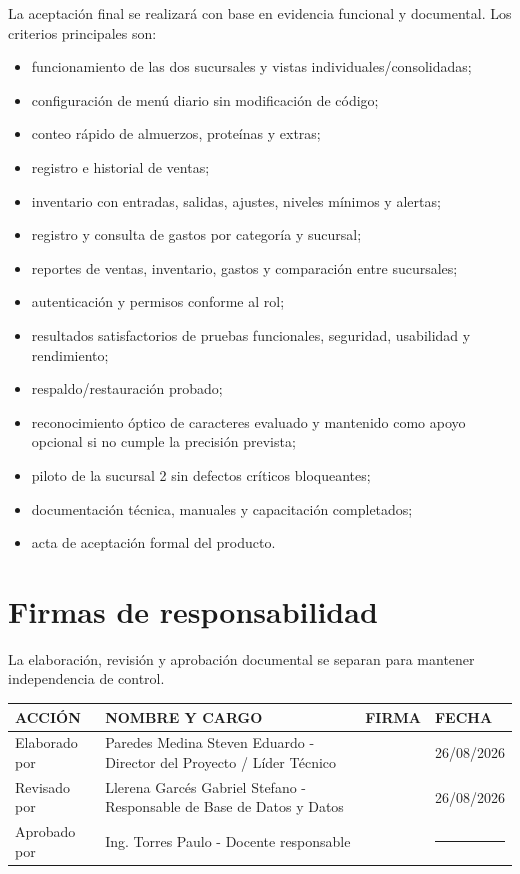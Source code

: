\documentclass[12pt,a4paper]{article}
\begin{document}
La aceptación final se realizará con base en evidencia funcional y documental. Los criterios principales son:

\begin{itemize}
    \item funcionamiento de las dos sucursales y vistas individuales/consolidadas;
    \item configuración de menú diario sin modificación de código;
    \item conteo rápido de almuerzos, proteínas y extras;
    \item registro e historial de ventas;
    \item inventario con entradas, salidas, ajustes, niveles mínimos y alertas;
    \item registro y consulta de gastos por categoría y sucursal;
    \item reportes de ventas, inventario, gastos y comparación entre sucursales;
    \item autenticación y permisos conforme al rol;
    \item resultados satisfactorios de pruebas funcionales, seguridad, usabilidad y rendimiento;
    \item respaldo/restauración probado;
    \item reconocimiento óptico de caracteres evaluado y mantenido como apoyo opcional si no cumple la precisión prevista;
    \item piloto de la sucursal 2 sin defectos críticos bloqueantes;
    \item documentación técnica, manuales y capacitación completados;
    \item acta de aceptación formal del producto.
\end{itemize}

\section{Firmas de responsabilidad}

La elaboración, revisión y aprobación documental se separan para mantener independencia de control.

\begin{center}
\renewcommand{\arraystretch}{1.55}
\begin{tabularx}{\textwidth}{|p{3cm}|X|p{3cm}|p{2.6cm}|}
\hline
\rowcolor{tableheader}
\textbf{ACCIÓN} & \textbf{NOMBRE Y CARGO} & \textbf{FIRMA} & \textbf{FECHA} \\ \hline
Elaborado por & Paredes Medina Steven Eduardo - Director del Proyecto / Líder Técnico & & 26/08/2026 \\ \hline
Revisado por & Llerena Garcés Gabriel Stefano - Responsable de Base de Datos y Datos & & 26/08/2026 \\ \hline
Aprobado por & Ing. Torres Paulo - Docente responsable & & \rule{2.1cm}{0.4pt} \\ \hline
\end{tabularx}
\end{center}
\end{document}
